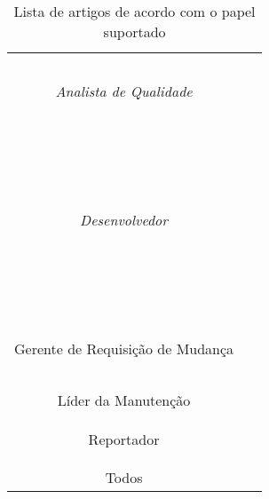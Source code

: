 \begin{table}[htbp]
{\begin{tabular}{@{}cl@{}}
\multirow{3}{*}{\textit{Analista de Qualidade}} &~\cite{izquierdo2015gila,
    gegick2010identifying, Aggarwal:2014:MIT:2593801.2593810,
    zimmermann2010makes} \\
 &~\cite{corley2011recovering, Song2010a, Nguyen:2012:MAR:2393596.2393671, White:2015:GRR:2820282.2820291} \\
 &~\cite{thung2012would, xia2015automatic, Tu:2014:MQI:2677832.2677844, Romo:2015:TAT:2745802.2745833, White:2015:GRR:2820282.2820291} \\ \midrule
\multirow{7}{*}{\textit{Desenvolvedor}} &~\cite{White:2015:GRR:2820282.2820291,zimmermann2010makes, Thung:2014:BIT:2635868.2661678, Nguyen:2012:MAR:2393596.2393671} \\
 &~\cite{Wang2011bug, Romo:2015:TAT:2745802.2745833, ValdiviaGarcia:2014:CPB:2597073.2597099, Nagwani2010} \\
 &~\cite{Koopaei:2015:CAD:2886444.2886474, Prifti2011, thung2012would, White:2015:GRR:2820282.2820291} \\
 &~\cite{tomavsev2013exploiting, thung2013automatic, banitaan2013decoba, corley2011recovering} \\
 &~\cite{Vijayakumar2014, gegick2010identifying, izquierdo2015gila, Tian2012} \\
 &~\cite{malheiros2012source, Song2010a, mani2012ausum} \\
 &~\cite{Tu:2014:MQI:2677832.2677844, Aggarwal:2014:MIT:2593801.2593810, Wong:2014:BBF:2705615.2706096} \\ \midrule
\multirow{3}{*}{Gerente de Requisição de Mudança} &~\cite{Vijayakumar2014, mani2012ausum, hindle2016contextual} \\
 &~\cite{gegick2010identifying, sun2010discriminative, alipour2013contextual, zhang2011bug} \\
 &~\cite{Nagwani2010, kochhar2014automatic, banerjee2012automated, ValdiviaGarcia:2014:CPB:2597073.2597099} \\ \midrule
Líder da Manutenção &~\cite{Vijayakumar2014, Tian2012, netto2010automated, Nagwani2010} \\ \midrule
\multirow{2}{*}{Reportador} &~\cite{zimmermann2010makes, Tu:2014:MQI:2677832.2677844, Vijayakumar2014} \\
 &~\cite{Moran:2015:EAA:2786805.2807557, Thung2014, moran2015auto} \\ \midrule
Todos &~\cite{hora2012bug, takama2013application, dal2014bug} \\ \bottomrule
\end{tabular}%
}
\caption{Lista de artigos de acordo com o papel suportado}\label{tab:taxonomia-suporte-papeis}
\end{table}